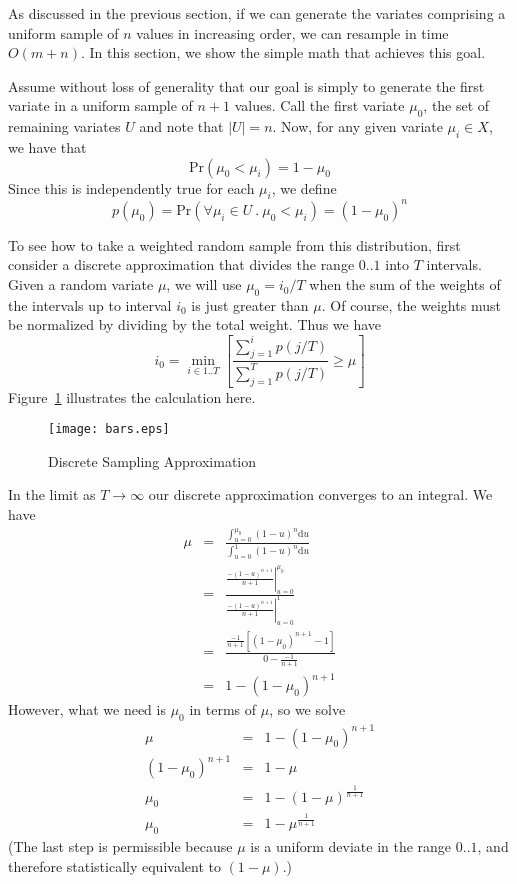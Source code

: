 \documentclass[12pt]{article}
\newcommand{\Prob}{\text{Pr}}
\newcommand{\du}{{\text{d}u}}
\begin{document}
  As discussed in the previous section, if we can generate
  the variates comprising a uniform sample of $n$ values in
  increasing order, we can resample in time $O(m + n)$.  In
  this section, we show the simple math that achieves this
  goal.

  Assume without loss of generality that our goal is simply
  to generate the first variate in a uniform sample of $n +
  1$ values.  Call the first variate $\mu_0$, the set of
  remaining variates $U$ and note that $|U|=n$.  Now, for
  any given variate $\mu_i \in X$, we have that
    $$ \Prob(\mu_0 < \mu_i) = 1 - \mu_0 $$
  Since this is independently true for each $\mu_i$, we define
    $$p(\mu_0) = \Prob(\forall \mu_i \in U ~.~ \mu_0 < \mu_i) = (1 - \mu_0)^n$$
  
  To see how to take a weighted random sample from this
  distribution, first consider a discrete approximation that
  divides the range $0..1$ into $T$ intervals.  Given a
  random variate $\mu$, we will use $\mu_0=i_0/T$ when
  the sum of the weights of the intervals up to interval $i_0$
  is just greater than $\mu$.  Of course, the weights must be
  normalized by dividing by the total weight.  Thus we have
    $$i_0=\min_{i\in1..T}\left[{\frac{\sum_{j=1}^{i}{p(j/T)}}
                         {\sum_{j=1}^{T}{p(j/T)}} \ge \mu}\right]$$
  Figure~\ref{fig-calculus} illustrates the calculation
  here.

  \begin{figure}
    \centering
    \texttt{[image: bars.eps]}
    \caption{Discrete Sampling Approximation}\label{fig-calculus}
  \end{figure}

  In the limit as $T\rightarrow\infty$ our discrete
  approximation converges to an integral.  We have
    \begin{eqnarray*}
      \mu &=& \frac{\int_{u=0}^{\mu_0}{(1-u)^n \du}}
                   {\int_{u=0}^{1}{(1-u)^n \du}} \\
	  &=& \frac{\left.\frac{-(1-u)^{n+1}}{n+1}\right|_{u=0}^{\mu_0}}
		   {\left.\frac{-(1-u)^{n+1}}{n+1}\right|_{u=0}^{1}} \\
          &=& \frac{\frac{-1}{n+1}\left[(1-\mu_0)^{n+1}-1\right]}
		   {0-\frac{-1}{n+1}} \\
          &=& 1 - (1 - \mu_0)^{n+1}
    \end{eqnarray*}
  However, what we need is $\mu_0$ in terms of
  $\mu$, so we solve
    \begin{eqnarray*}
       \mu &=& 1 - (1 - \mu_0)^{n+1} \\
       (1 - \mu_0)^{n+1} &=& 1 - \mu \\
       \mu_0 &=& 1 - (1 - \mu)^\frac{1}{n+1} \\
       \mu_0 &=& 1 - \mu^\frac{1}{n+1}
    \end{eqnarray*}
  (The last step is permissible because $\mu$ is a
  uniform deviate in the range $0..1$, and therefore
  statistically equivalent to $(1-\mu)$.)
\end{document}
